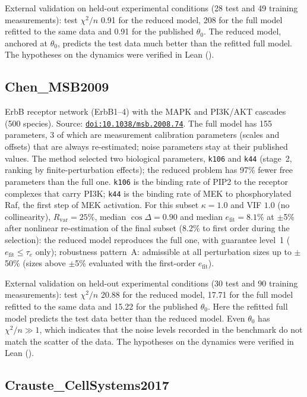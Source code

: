 External validation on held-out experimental conditions (28 test and 49 training measurements): test $\chi^2/n$ 0.91 for the reduced model, 208 for the full model refitted to the same data and 0.91 for the published $\theta_0$. The reduced model, anchored at $\theta_0$, predicts the test data much better than the refitted full model. The hypotheses on the dynamics were verified in Lean ().

\subsection*{Chen\_MSB2009}

ErbB receptor network (ErbB1--4) with the MAPK and PI3K/AKT cascades (500 species). Source: \href{https://doi.org/10.1038/msb.2008.74}{\nolinkurl{doi:10.1038/msb.2008.74}}. The full model has 155 parameters, 3 of which are measurement calibration parameters (scales and offsets) that are always re-estimated; noise parameters stay at their published values. The method selected two biological parameters, \texttt{k106} and \texttt{k44} (stage~2, ranking by finite-perturbation effects); the reduced problem has 97\% fewer free parameters than the full one. \texttt{k106} is the binding rate of PIP2 to the receptor complexes that carry PI3K; \texttt{k44} is the binding rate of MEK to phosphorylated Raf, the first step of MEK activation. For this subset $\kappa=1.0$ and VIF $1.0$ (no collinearity), $R_{\mathrm{var}}=25\%$, median $\cos\Delta=0.90$ and median $e_{\mathrm{fit}}=8.1\%$ at $\pm$5\% after nonlinear re-estimation of the final subset (8.2\% to first order during the selection): the reduced model reproduces the full one, with guarantee level~1 ($e_{\mathrm{fit}}\le\tau_e$ only); robustness pattern~A: admissible at all perturbation sizes up to $\pm$50\% (sizes above $\pm$5\% evaluated with the first-order $e_{\mathrm{fit}}$).

External validation on held-out experimental conditions (30 test and 90 training measurements): test $\chi^2/n$ 20.88 for the reduced model, 17.71 for the full model refitted to the same data and 15.22 for the published $\theta_0$. Here the refitted full model predicts the test data better than the reduced model. Even $\theta_0$ has $\chi^2/n\gg1$, which indicates that the noise levels recorded in the benchmark do not match the scatter of the data. The hypotheses on the dynamics were verified in Lean ().

\subsection*{Crauste\_CellSystems2017}

